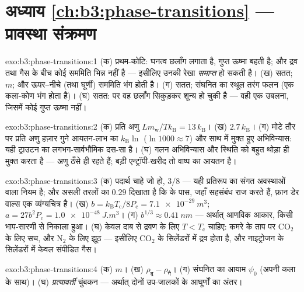 \section*{अध्याय \ref{ch:b3:phase-transitions} --- प्रावस्था संक्रमण}

\begin{solution}{exo:b3:phase-transitions:1}
(क) प्रथम-कोटि: घनत्व छलाँग लगाता है, गुप्त ऊष्मा बहती है; और द्रव
तथा गैस के बीच कोई सममिति भिन्न नहीं है --- इसीलिए उनकी रेखा
\emph{समाप्त} हो सकती है। (ख) सतत;  $m$; और ऊपर--नीचे
(तथा घूर्णी) सममिति भंग होती है। (ग) सतत; संघनित का
स्थूल तरंग फलन (एक कला-कोण भंग होता है)। (घ) सतत:
 पर वह छलाँग सिकुड़कर शून्य हो चुकी है --- वही एक
उबलना, जिसमें कोई गुप्त ऊष्मा नहीं।
\end{solution}

\begin{solution}{exo:b3:phase-transitions:2}
(क) प्रति अणु $Lm_{\text{w}}/Tk_{\text{B}} = 13\,k_{\text{B}}$।
(ख) $2.7\,k_{\text{B}}$। (ग) मोटे तौर पर प्रति अणु हज़ार गुने
आयतन-लाभ का $k_{\text{B}}\ln$ ($\ln1000 \approx 7$) और साथ में
मुक्त हुए अभिविन्यास: यही ट्राउटन का लगभग-सार्वभौमिक दस-सा है। (घ)
गलन अभिविन्यास और स्थिति को बहुत थोड़ा ही मुक्त करता है --- अणु
ठँसे ही रहते हैं; बड़ी एन्ट्रॉपी-खरीद तो वाष्प का आयतन है।
\end{solution}

\begin{solution}{exo:b3:phase-transitions:3}
(क) पदार्थ चाहे जो हो, $3/8$ --- यही प्रतिरूप का संगत अवस्थाओं वाला
नियम है; और असली तरलों का $0.29$ दिखाता है कि  के पास,
जहाँ सहसंबंध राज करते हैं, फ़ान डेर वाल्स एक व्यंग्यचित्र है। (ख) $b =
k_{\text{B}}T_{\text{c}}/8P_{\text{c}} = \qty{7.1e-29}{m^3}$; $a =
27b^2P_{\text{c}} = \qty{1.0e-48}{J.m^3}$। (ग) $b^{1/3} \approx
\qty{0.41}{nm}$ --- अर्थात् आणविक आकार, किसी भाप-सारणी से निकाला
हुआ। (घ) केवल दाब से द्रवण के लिए $T <
T_{\text{c}}$ चाहिए: कमरे के ताप पर CO$_2$ के लिए सच, और
N$_2$ के लिए झूठ --- इसीलिए CO$_2$ के सिलेंडरों में द्रव होता है,
और नाइट्रोजन के सिलेंडरों में केवल संपीडित गैस।
\end{solution}

\begin{solution}{exo:b3:phase-transitions:4}
(क) $m$। (ख) $\rho_{\text{द्र}} - \rho_{\text{गै}}$। (ग)
संघनित का आयाम $\psi_0$ (अपनी कला के साथ)। (घ)
\emph{प्रत्यावर्ती} चुंबकन --- अर्थात् दोनों उप-जालकों के आघूर्णों
का अंतर।
\end{solution}

